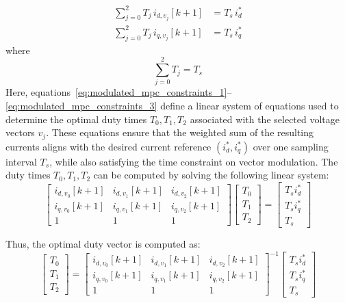 \begin{align}
\sum_{j=0}^{2} T_j\, i_{d,v_j}[k+1] &= T_s\, i_d^{*} \label{eq:modulated_mpc_constraints_1}\\
\sum_{j=0}^{2} T_j\, i_{q,v_j}[k+1] &= T_s\, i_q^{*} \label{eq:modulated_mpc_constraints_2}
\end{align}
where
\begin{equation}
\sum_{j=0}^{2} T_j = T_s
\label{eq:modulated_mpc_constraints_3}
\end{equation}
Here, equations~\eqref{eq:modulated_mpc_constraints_1}–\eqref{eq:modulated_mpc_constraints_3} define a linear system of equations used to determine the optimal duty times \( T_0, T_1, T_2 \) associated with the selected voltage vectors \( v_j \). These equations ensure that the weighted sum of the resulting currents aligns with the desired current reference \( (i_d^*, i_q^*) \) over one sampling interval \( T_s \), while also satisfying the time constraint on vector modulation. The duty times \( T_0, T_1, T_2 \) can be computed by solving the following linear system:
\begin{equation}
\begin{bmatrix}
i_{d,v_0}[k+1] & i_{d,v_1}[k+1] & i_{d,v_2}[k+1] \\
i_{q,v_0}[k+1] & i_{q,v_1}[k+1]  & i_{q,v_2}[k+1]  \\
1        & 1        & 1
\end{bmatrix}
\begin{bmatrix}
T_0 \\ T_1 \\ T_2
\end{bmatrix}
=
\begin{bmatrix}
T_s i_d^* \\ T_s i_q^* \\ T_s
\end{bmatrix}
\label{eq:duty_time_solution}
\end{equation}

\noindent
Thus, the optimal duty vector is computed as:
\begin{equation}
\begin{bmatrix}
T_0 \\ T_1 \\ T_2
\end{bmatrix}
=
\begin{bmatrix}
i_{d,v_0}[k+1] & i_{d,v_1}[k+1] & i_{d,v_2}[k+1] \\
i_{q,v_0}[k+1] & i_{q,v_1}[k+1]  & i_{q,v_2}[k+1]  \\
1        & 1        & 1
\end{bmatrix}^{-1}
\begin{bmatrix}
T_s i_d^* \\ T_s i_q^* \\ T_s
\end{bmatrix}
\label{eq:duty_time_closed_form}
\end{equation}

